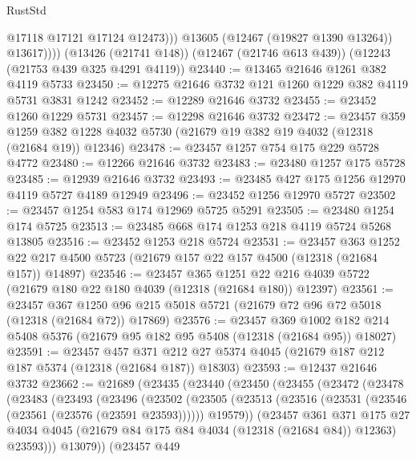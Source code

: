 \begin{lexlean}{RustStd}
\begin{coremodule}
                  @17118
                  @17121
                  @17124
                  @12473)))
            @13605
            (@12467 (@19827 @1390 @13264))
            @13617))))
    (@13426 (@21741 @148))
    (@12467 (@21746 @613 @439))
    (@12243 (@21753 @439 @325 @4291 @4119))
@23440 := @13465 @21646 @1261 @382 @4119 @5733
@23450 := @12275 @21646 @3732 @121 @1260 @1229 @382 @4119 @5731 @3831 @1242
@23452 := @12289 @21646 @3732
@23455 := @23452 @1260 @1229 @5731
@23457 := @12298 @21646 @3732
@23472 := @23457
    @359
    @1259
    @382
    @1228
    @4032
    @5730
    (@21679 @19 @382 @19 @4032 (@12318 (@21684 @19)) @12346)
@23478 := @23457 @1257 @754 @175 @229 @5728 @4772
@23480 := @12266 @21646 @3732
@23483 := @23480 @1257 @175 @5728
@23485 := @12939 @21646 @3732
@23493 := @23485 @427 @175 @1256 @12970 @4119 @5727 @4189 @12949
@23496 := @23452 @1256 @12970 @5727
@23502 := @23457 @1254 @583 @174 @12969 @5725 @5291
@23505 := @23480 @1254 @174 @5725
@23513 := @23485 @668 @174 @1253 @218 @4119 @5724 @5268 @13805
@23516 := @23452 @1253 @218 @5724
@23531 := @23457
    @363
    @1252
    @22
    @217
    @4500
    @5723
    (@21679 @157 @22 @157 @4500 (@12318 (@21684 @157)) @14897)
@23546 := @23457
    @365
    @1251
    @22
    @216
    @4039
    @5722
    (@21679 @180 @22 @180 @4039 (@12318 (@21684 @180)) @12397)
@23561 := @23457
    @367
    @1250
    @96
    @215
    @5018
    @5721
    (@21679 @72 @96 @72 @5018 (@12318 (@21684 @72)) @17869)
@23576 := @23457
    @369
    @1002
    @182
    @214
    @5408
    @5376
    (@21679 @95 @182 @95 @5408 (@12318 (@21684 @95)) @18027)
@23591 := @23457
    @457
    @371
    @212
    @27
    @5374
    @4045
    (@21679 @187 @212 @187 @5374 (@12318 (@21684 @187)) @18303)
@23593 := @12437 @21646 @3732
@23662 := @21689
    (@23435
      (@23440
        (@23450
          (@23455
            (@23472
              (@23478
                (@23483
                  (@23493
                    (@23496
                      (@23502
                        (@23505
                          (@23513
                            (@23516 (@23531 (@23546 (@23561 (@23576 (@23591 @23593))))))
                            @19579))
                        (@23457
                          @361
                          @371
                          @175
                          @27
                          @4034
                          @4045
                          (@21679 @84 @175 @84 @4034 (@12318 (@21684 @84)) @12363)
                          @23593)))
                    @13079))
                (@23457
                  @449

\end{coremodule}
\end{lexlean}
